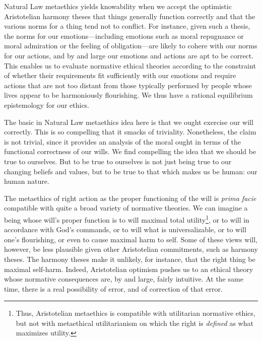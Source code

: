 Natural Law metaethics yields knowability when we accept the optimistic Aristotelian harmony theses that things generally function
correctly and that the various norms for a thing tend not to conflict. For instance, given such a thesis, the norms for our
emotions---including emotions such as moral repugnance or moral admiration or the feeling of obligation---are likely to cohere
with our norms for our actions, and by and large our emotions and actions are apt to be correct. This enables us to evaluate
normative ethical theories according to the constraint of whether their requirements fit sufficiently with our emotions and require
actions that are not too distant from those typically performed by people whose lives appear to
be harmoniously flourishing.  We thus have a rational equilibrium epistemology for our ethics.

The basic in Natural Law metaethics idea here is that we ought exercise our will correctly. This is so compelling that it smacks of triviality. Nonetheless,
the claim is not trivial, since it provides an analysis of the moral ought in terms of the functional correctness of our wills.
We find compelling the idea that we should be true to ourselves. But to be true to ourselves is not just being true to 
our changing beliefs and values, but to be true to that which makes us be human: our human nature.

The metaethics of right action as the proper functioning of the will is \textit{prima facie} compatible with quite a broad variety of normative theories.
We can imagine a being whose will's proper function is to will maximal total utility\footnote{Thus, Aristotelian metaethics is compatible with
utilitarian normative ethics, but not with metaethical utilitarianism on which the right is \textit{defined} as what maximizes utility.}, or to will in accordance with God's commands, or
to will what is universalizable, or to will one's flourishing, or even to cause maximal harm to self. Some of these views will, however, be less
plausible given other Aristotelian commitments, such as harmony theses. The harmony theses make it unlikely, for instance, that the right thing
be maximal self-harm. Indeed, Aristotelian optimism pushes us to an ethical theory whose normative consequences are, 
by and large, fairly intuitive.
At the same time, there is a real possibility of error, and of correction of that error.

